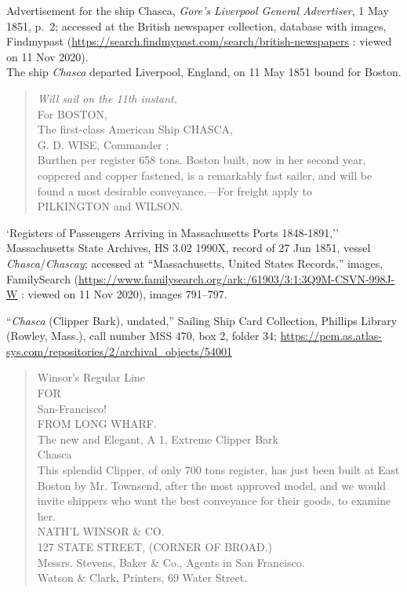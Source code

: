 \begin{thebibliography}{999}
Advertisement for the ship Chasca, \textit{Gore's Liverpool General Advertiser}, 1 May 1851, p.\ 2; accessed at the British newspaper collection, database with images, Findmypast (\url{https://search.findmypast.com/search/british-newspapers} : viewed on 11 Nov 2020).\\
The ship \textit{Chasca} departed Liverpool, England, on 11 May 1851 bound for Boston. 
\begin{quote}
	\textit{Will sail on the 11th instant.}\\
	For BOSTON,\\
	The first-class American Ship CHASCA,\\
	G. D. WISE, Commander ;\\
	Burthen per register 658 tons. Boston built, now in her second year, coppered and copper fastened, is a remarkably fast sailer, and will be found a most desirable conveyance.---For freight apply to\\
	PILKINGTON and WILSON.
\end{quote}

`Registers of Passengers Arriving in Massachusetts Ports 1848-1891,'' Massachusetts State Archives, HS 3.02 1990X, record of 27 Jun 1851, vessel \textit{Chasca}/\textit{Chascay}; accessed at ``Massachusetts, United States Records,'' images, FamilySearch (\url{https://www.familysearch.org/ark:/61903/3:1:3Q9M-CSVN-998J-W} : viewed on 11 Nov 2020), images 791--797.

``\textit{Chasca} (Clipper Bark), undated,'' Sailing Ship Card Collection, Phillips Library (Rowley, Mass.), call number MSS 470, box 2, folder 34; \url{https://pem.as.atlas-sys.com/repositories/2/archival_objects/54001}\\
\begin{quote}
	Winsor's Regular Line\\
	FOR\\
	San-Francisco!\\
	FROM LONG WHARF.\\
	The new and Elegant, A 1, Extreme Clipper Bark\\
	Chasca\\
	This splendid Clipper, of only 700 tons register, has just been built at East Boston by Mr. Townsend, after the most approved model, and we would invite shippers who want the best conveyance for their goods, to examine her.\\
	NATH'L WINSOR \& CO.\\
	127 STATE STREET, (CORNER OF BROAD.)\\
	Messrs. Stevens, Baker \& Co., Agents in San Francisco.\\
	Watson \& Clark, Printers, 69 Water Street.	
\end{quote}


\end{thebibliography}
